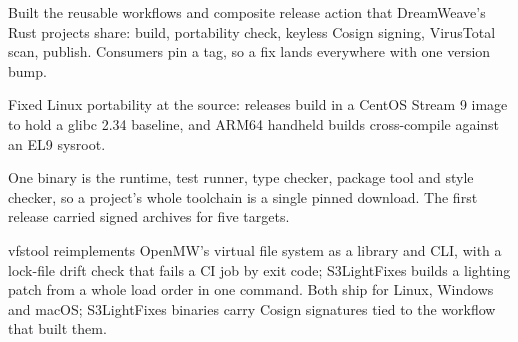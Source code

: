 \documentclass{resume}
\begin{document}
\begin{bullets}
  \item Built the reusable workflows and composite release action that DreamWeave's Rust projects share: build, portability check, keyless Cosign signing, VirusTotal scan, publish. Consumers pin a tag, so a fix lands everywhere with one version bump.
  \item Fixed Linux portability at the source: releases build in a CentOS Stream 9 image to hold a glibc 2.34 baseline, and ARM64 handheld builds cross-compile against an EL9 sysroot.
\end{bullets}

\begin{bullets}
  \item One binary is the runtime, test runner, type checker, package tool and style checker, so a project's whole toolchain is a single pinned download. The first release carried signed archives for five targets.
\end{bullets}

\begin{bullets}
  \item vfstool reimplements OpenMW's virtual file system as a library and CLI, with a lock-file drift check that fails a CI job by exit code; S3LightFixes builds a lighting patch from a whole load order in one command. Both ship for Linux, Windows and macOS; S3LightFixes binaries carry Cosign signatures tied to the workflow that built them.
\end{bullets}
\end{document}
